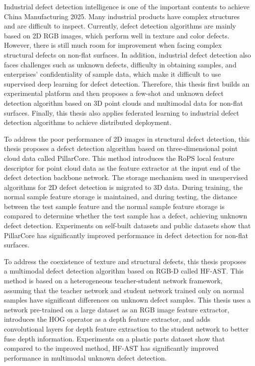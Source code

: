 \begin{abstractEn}
  Industrial defect detection intelligence is one of the important contents to achieve China Manufacturing 2025. Many industrial products have complex structures and are difficult to inspect. Currently, defect detection algorithms are mainly based on 2D RGB images, which perform well in texture and color defects. However, there is still much room for improvement when facing complex structural defects on non-flat surfaces. In addition, industrial defect detection also faces challenges such as unknown defects, difficulty in obtaining samples, and enterprises' confidentiality of sample data, which make it difficult to use supervised deep learning for defect detection. Therefore, this thesis first builds an experimental platform and then proposes a few-shot and unknown defect detection algorithm based on 3D point clouds and multimodal data for non-flat surfaces. Finally, this thesis also applies federated learning to industrial defect detection algorithms to achieve distributed deployment.

  To address the poor performance of 2D images in structural defect detection, this thesis proposes a defect detection algorithm based on three-dimensional point cloud data called PillarCore. This method introduces the RoPS local feature descriptor for point cloud data as the feature extractor at the input end of the defect detection backbone network. The storage mechanism used in unsupervised algorithms for 2D defect detection is migrated to 3D data. During training, the normal sample feature storage is maintained, and during testing, the distance between the test sample feature and the normal sample feature storage is compared to determine whether the test sample has a defect, achieving unknown defect detection. Experiments on self-built datasets and public datasets show that PillarCore has significantly improved performance in defect detection for non-flat surfaces.
  
  To address the coexistence of texture and structural defects, this thesis proposes a multimodal defect detection algorithm based on RGB-D called HF-AST. This method is based on a heterogeneous teacher-student network framework, assuming that the teacher network and student network trained only on normal samples have significant differences on unknown defect samples. This thesis uses a network pre-trained on a large dataset as an RGB image feature extractor, introduces the HOG operator as a depth feature extractor, and adds convolutional layers for depth feature extraction to the student network to better fuse depth information. Experiments on a plastic parts dataset show that compared to the improved method, HF-AST has significantly improved performance in multimodal unknown defect detection.
  

\end{abstractEn}

